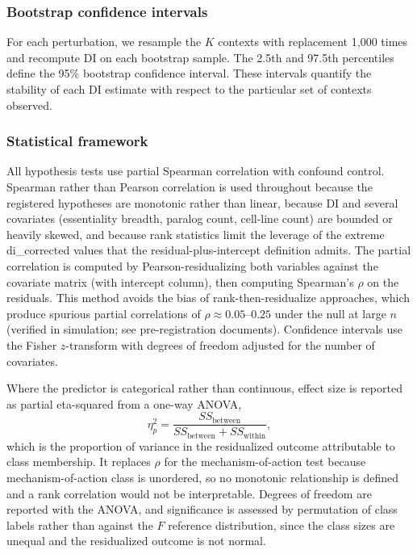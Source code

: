 \documentclass[11pt]{article}
\begin{document}
\subsubsection*{Bootstrap confidence intervals}

For each perturbation, we resample the $K$ contexts with replacement
1{,}000 times and recompute DI on each bootstrap sample.  The 2.5th and
97.5th percentiles define the 95\% bootstrap confidence interval.  These
intervals quantify the stability of each DI estimate with respect to the
particular set of contexts observed.

\subsubsection*{Statistical framework}

All hypothesis tests use partial Spearman correlation with confound
control.  Spearman rather than Pearson correlation is used throughout because the
registered hypotheses are monotonic rather than linear, because DI and several
covariates (essentiality breadth, paralog count, cell-line count) are bounded or
heavily skewed, and because rank statistics limit the leverage of the extreme
di\_corrected values that the residual-plus-intercept definition admits.  The
partial correlation is computed by Pearson-residualizing
both variables against the covariate matrix (with intercept column),
then computing Spearman's $\rho$ on the residuals.  This method avoids
the bias of rank-then-residualize approaches, which produce spurious
partial correlations of $\rho \approx 0.05$--$0.25$ under the null at
large $n$ (verified in simulation; see pre-registration documents).
Confidence intervals use the Fisher $z$-transform with degrees of
freedom adjusted for the number of covariates.

Where the predictor is categorical rather than continuous, effect size is reported
as partial eta-squared from a one-way ANOVA,
\begin{equation}
\eta^2_p = \frac{SS_{\text{between}}}{SS_{\text{between}} + SS_{\text{within}}},
\end{equation}
which is the proportion of variance in the residualized outcome attributable to
class membership.  It replaces $\rho$ for the mechanism-of-action test because
mechanism-of-action class is unordered, so no monotonic relationship is defined
and a rank correlation would not be interpretable.  Degrees of freedom are reported with the
ANOVA, and significance is assessed by permutation of class labels rather than
against the $F$ reference distribution, since the class sizes are unequal and the
residualized outcome is not normal.
\end{document}
